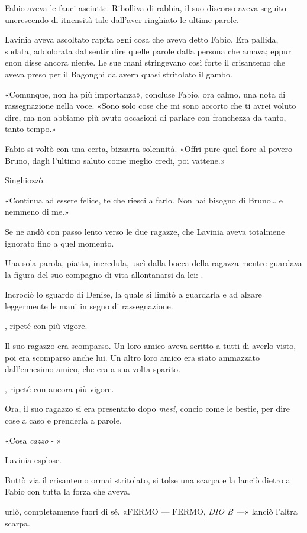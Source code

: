 Fabio aveva le fauci asciutte. Ribolliva di rabbia, il suo discorso
aveva seguito uncrescendo di itnensità tale dall'aver ringhiato le
ultime parole.

Lavinia aveva ascoltato rapita ogni cosa che aveva detto Fabio. Era
pallida, sudata, addolorata dal sentir dire quelle parole dalla persona
che amava; eppur enon disse ancora niente. Le sue mani stringevano così
forte il crisantemo che aveva preso per il Bagonghi da avern quasi
stritolato il gambo.

«Comunque, non ha più importanza», concluse
Fabio, ora calmo, una nota di rassegnazione nella voce. «Sono
solo cose che mi sono accorto che ti avrei voluto dire, ma non abbiamo
più avuto occasioni di parlare con franchezza da tanto, tanto
tempo.»

Fabio si voltò con una certa, bizzarra solennità. «Offri pure
quel fiore al povero Bruno, dagli l'ultimo saluto come meglio credi, poi
vattene.»

Singhiozzò.

«Continua ad essere felice, te che riesci a farlo. Non hai
bisogno di Bruno\ldots{} e nemmeno di me.»

Se ne andò con passo lento verso le due ragazze, che Lavinia aveva
totalmene ignorato fino a quel momento.

Una sola parola, piatta, incredula, uscì dalla bocca della ragazza
mentre guardava la figura del suo compagno di vita allontanarsi da lei:
.

Incrociò lo sguardo di Denise, la quale si limitò a guardarla e ad
alzare leggermente le mani in segno di rassegnazione.

, ripeté con più vigore.

Il suo ragazzo era scomparso. Un loro amico aveva scritto a tutti di
averlo visto, poi era scomparso anche lui. Un altro loro amico era stato
ammazzato dall'ennesimo amico, che era a sua volta sparito.

, ripeté con ancora più vigore.

Ora, il suo ragazzo si era presentato dopo \emph{mesi}, concio come le
bestie, per dire cose a caso e prenderla a parole.

«Cosa \emph{cazzo} - »

Lavinia esplose.

Buttò via il crisantemo ormai stritolato, si tolse una scarpa e la
lanciò dietro a Fabio con tutta la forza che aveva.

 urlò, completamente fuori di sé. «FERMO --- FERMO, \emph{DIO
B ---}» lanciò l'altra scarpa.

